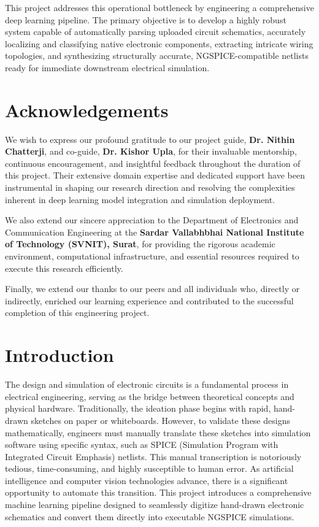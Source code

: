 \documentclass[12pt]{article}
\begin{document}
This project addresses this operational bottleneck by engineering a comprehensive deep learning pipeline. The primary objective is to develop a highly robust system capable of automatically parsing uploaded circuit schematics, accurately localizing and classifying native electronic components, extracting intricate wiring topologies, and synthesizing structurally accurate, NGSPICE-compatible netlists ready for immediate downstream electrical simulation.

\newpage
\section*{Acknowledgements}
We wish to express our profound gratitude to our project guide, \textbf{Dr. Nithin Chatterji}, and co-guide, \textbf{Dr. Kishor Upla}, for their invaluable mentorship, continuous encouragement, and insightful feedback throughout the duration of this project. Their extensive domain expertise and dedicated support have been instrumental in shaping our research direction and resolving the complexities inherent in deep learning model integration and simulation deployment.

We also extend our sincere appreciation to the Department of Electronics and Communication Engineering at the \textbf{Sardar Vallabhbhai National Institute of Technology (SVNIT), Surat}, for providing the rigorous academic environment, computational infrastructure, and essential resources required to execute this research efficiently.

Finally, we extend our thanks to our peers and all individuals who, directly or indirectly, enriched our learning experience and contributed to the successful completion of this engineering project.

\newpage
\tableofcontents

\newpage
{}

\section{Introduction}

The design and simulation of electronic circuits is a fundamental process in electrical engineering, serving as the bridge between theoretical concepts and physical hardware. Traditionally, the ideation phase begins with rapid, hand-drawn sketches on paper or whiteboards. However, to validate these designs mathematically, engineers must manually translate these sketches into simulation software using specific syntax, such as SPICE (Simulation Program with Integrated Circuit Emphasis) netlists. This manual transcription is notoriously tedious, time-consuming, and highly susceptible to human error. As artificial intelligence and computer vision technologies advance, there is a significant opportunity to automate this transition. This project introduces a comprehensive machine learning pipeline designed to seamlessly digitize hand-drawn electronic schematics and convert them directly into executable NGSPICE simulations.
\end{document}
